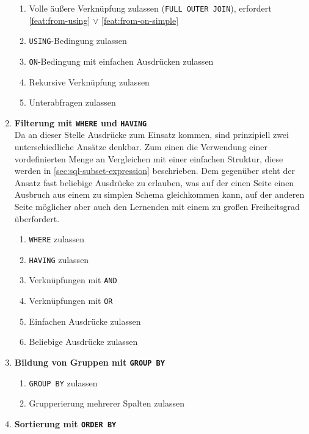 \begin{enumerate}
\begin{enumerate}
  \item \label{feat:from-full-join} Volle äußere Verknüpfung zulassen (\texttt{FULL OUTER JOIN}), erfordert \ref{feat:from-using} $\lor$ \ref{feat:from-on-simple}
  \item \label{feat:from-using} \texttt{USING}-Bedingung zulassen
  \item \label{feat:from-on-simple} \texttt{ON}-Bedingung mit einfachen Ausdrücken zulassen
  \item \label{feat:from-recursive} Rekursive Verknüpfung zulassen 
  \item \label{feat:from-sub} Unterabfragen zulassen
  \end{enumerate}
\item \textbf{Filterung mit \texttt{WHERE} und \texttt{HAVING}} \\
  Da an dieser Stelle Ausdrücke zum Einsatz kommen, sind prinzipiell zwei unterschiedliche Ansätze denkbar. Zum einen die Verwendung einer vordefinierten Menge an Vergleichen mit einer einfachen Struktur, diese werden in \ref{sec:sql-subset-expression} beschrieben. Dem gegenüber steht der Ansatz fast beliebige Ausdrücke zu erlauben, was auf der einen Seite einen Ausbruch aus einem zu simplen Schema gleichkommen kann, auf der anderen Seite möglicher aber auch den Lernenden mit einem zu großen Freiheitsgrad überfordert.
  \begin{enumerate}
  \item \label{feat:where-allow} \texttt{WHERE} zulassen
  \item \label{feat:having-allow} \texttt{HAVING} zulassen
  \item \label{feat:where-and} Verknüpfungen mit \texttt{AND}
  \item \label{feat:where-or} Verknüpfungen mit \texttt{OR}
  \item \label{feat:where-simple-expression} Einfachen Ausdrücke zulassen
  \item \label{feat:where-expression} Beliebige Ausdrücke zulassen
  \end{enumerate}
\item \textbf{Bildung von Gruppen mit \texttt{GROUP BY}}
  \begin{enumerate}
  \item \label{feat:group-allow} \texttt{GROUP BY} zulassen
  \item \label{feat:group-multiple} Grupperierung mehrerer Spalten zulassen
  \end{enumerate}
\item \textbf{Sortierung mit \texttt{ORDER BY}} \\

\end{enumerate}
